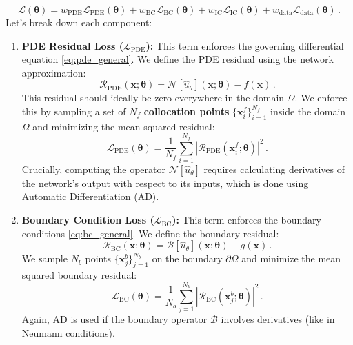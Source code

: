 \begin{equation}
\mathcal{L}(\boldsymbol{\theta}) = w_{\text{PDE}}\mathcal{L}_{\text{PDE}}(\boldsymbol{\theta}) + w_{\text{BC}}\mathcal{L}_{\text{BC}}(\boldsymbol{\theta}) + w_{\text{IC}}\mathcal{L}_{\text{IC}}(\boldsymbol{\theta}) + w_{\text{data}}\mathcal{L}_{\text{data}}(\boldsymbol{\theta}) \,.
\label{eq:loss_general}
\end{equation}
%
Let's break down each component:

\begin{enumerate}
    \item \textbf{PDE Residual Loss ($\mathcal{L}_{\text{PDE}}$):} This term enforces the governing differential equation \eqref{eq:pde_general}. We define the PDE residual using the network approximation:
    \begin{equation*}
    \mathcal{R}_{\text{PDE}}(\mathbf{x}; \boldsymbol{\theta}) = \mathcal{N}[\hat{u}_\theta](\mathbf{x}; \boldsymbol{\theta}) - f(\mathbf{x})\,.
    \end{equation*}
    This residual should ideally be zero everywhere in the domain $\Omega$. We enforce this by sampling a set of $N_f$ \textbf{collocation points} $\{\mathbf{x}_i^f\}_{i=1}^{N_f}$ inside the domain $\Omega$ and minimizing the mean squared residual:
    \begin{equation}
    \mathcal{L}_{\text{PDE}}(\boldsymbol{\theta}) = \frac{1}{N_{f}} \sum_{i=1}^{N_{f}} \left| \mathcal{R}_{\text{PDE}}(\mathbf{x}_i^f; \boldsymbol{\theta}) \right|^2\,.
    \label{eq:pde_loss_general}
    \end{equation}
    Crucially, computing the operator $\mathcal{N}[\hat{u}_\theta]$ requires calculating derivatives of the network's output with respect to its inputs, which is done using Automatic Differentiation (AD).

    \item \textbf{Boundary Condition Loss ($\mathcal{L}_{\text{BC}}$):} This term enforces the boundary conditions \eqref{eq:bc_general}. We define the boundary residual:
    \begin{equation*}
    \mathcal{R}_{\text{BC}}(\mathbf{x}; \boldsymbol{\theta}) = \mathcal{B}[\hat{u}_\theta](\mathbf{x}; \boldsymbol{\theta}) - g(\mathbf{x})\,.
    \end{equation*}
    We sample $N_b$ points $\{\mathbf{x}_j^b\}_{j=1}^{N_b}$ on the boundary $\partial\Omega$ and minimize the mean squared boundary residual:
    \begin{equation}
    \mathcal{L}_{\text{BC}}(\boldsymbol{\theta}) = \frac{1}{N_{b}} \sum_{j=1}^{N_{b}} \left| \mathcal{R}_{\text{BC}}(\mathbf{x}_j^b; \boldsymbol{\theta}) \right|^2\,.
    \label{eq:bc_loss_general}
    \end{equation}
    Again, AD is used if the boundary operator $\mathcal{B}$ involves derivatives (like in Neumann conditions).


\end{enumerate}
